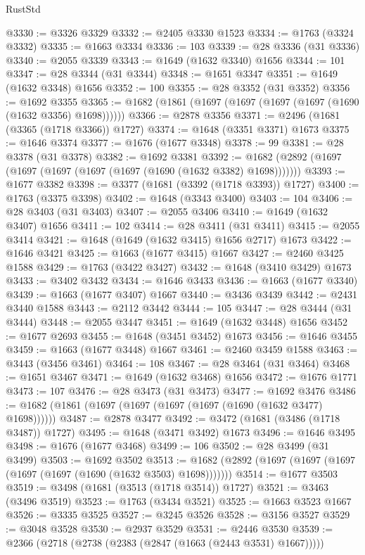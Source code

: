 \begin{lexlean}{RustStd}
\begin{coremodule}
@3330 := @3326 @3329
@3332 := @2405 @3330 @1523
@3334 := @1763 (@3324 @3332)
@3335 := @1663 @3334
@3336 := 103
@3339 := @28 @3336 (@31 @3336)
@3340 := @2055 @3339
@3343 := @1649 (@1632 @3340) @1656
@3344 := 101
@3347 := @28 @3344 (@31 @3344)
@3348 := @1651 @3347
@3351 := @1649 (@1632 @3348) @1656
@3352 := 100
@3355 := @28 @3352 (@31 @3352)
@3356 := @1692 @3355
@3365 := @1682 (@1861 (@1697 (@1697 (@1697 (@1697 (@1690 (@1632 @3356) @1698))))))
@3366 := @2878 @3356
@3371 := @2496 (@1681 (@3365 (@1718 @3366)) @1727)
@3374 := @1648 (@3351 @3371) @1673
@3375 := @1646 @3374
@3377 := @1676 (@1677 @3348)
@3378 := 99
@3381 := @28 @3378 (@31 @3378)
@3382 := @1692 @3381
@3392 := @1682 (@2892 (@1697 (@1697 (@1697 (@1697 (@1697 (@1690 (@1632 @3382) @1698)))))))
@3393 := @1677 @3382
@3398 := @3377 (@1681 (@3392 (@1718 @3393)) @1727)
@3400 := @1763 (@3375 @3398)
@3402 := @1648 (@3343 @3400)
@3403 := 104
@3406 := @28 @3403 (@31 @3403)
@3407 := @2055 @3406
@3410 := @1649 (@1632 @3407) @1656
@3411 := 102
@3414 := @28 @3411 (@31 @3411)
@3415 := @2055 @3414
@3421 := @1648 (@1649 (@1632 @3415) @1656 @2717) @1673
@3422 := @1646 @3421
@3425 := @1663 (@1677 @3415) @1667
@3427 := @2460 @3425 @1588
@3429 := @1763 (@3422 @3427)
@3432 := @1648 (@3410 @3429) @1673
@3433 := @3402 @3432
@3434 := @1646 @3433
@3436 := @1663 (@1677 @3340)
@3439 := @1663 (@1677 @3407) @1667
@3440 := @3436 @3439
@3442 := @2431 @3440 @1588
@3443 := @2112 @3442
@3444 := 105
@3447 := @28 @3444 (@31 @3444)
@3448 := @2055 @3447
@3451 := @1649 (@1632 @3448) @1656
@3452 := @1677 @2693
@3455 := @1648 (@3451 @3452) @1673
@3456 := @1646 @3455
@3459 := @1663 (@1677 @3448) @1667
@3461 := @2460 @3459 @1588
@3463 := @3443 (@3456 @3461)
@3464 := 108
@3467 := @28 @3464 (@31 @3464)
@3468 := @1651 @3467
@3471 := @1649 (@1632 @3468) @1656
@3472 := @1676 @1771
@3473 := 107
@3476 := @28 @3473 (@31 @3473)
@3477 := @1692 @3476
@3486 := @1682 (@1861 (@1697 (@1697 (@1697 (@1697 (@1690 (@1632 @3477) @1698))))))
@3487 := @2878 @3477
@3492 := @3472 (@1681 (@3486 (@1718 @3487)) @1727)
@3495 := @1648 (@3471 @3492) @1673
@3496 := @1646 @3495
@3498 := @1676 (@1677 @3468)
@3499 := 106
@3502 := @28 @3499 (@31 @3499)
@3503 := @1692 @3502
@3513 := @1682 (@2892 (@1697 (@1697 (@1697 (@1697 (@1697 (@1690 (@1632 @3503) @1698)))))))
@3514 := @1677 @3503
@3519 := @3498 (@1681 (@3513 (@1718 @3514)) @1727)
@3521 := @3463 (@3496 @3519)
@3523 := @1763 (@3434 @3521)
@3525 := @1663 @3523 @1667
@3526 := @3335 @3525
@3527 := @3245 @3526
@3528 := @3156 @3527
@3529 := @3048 @3528
@3530 := @2937 @3529
@3531 := @2446 @3530
@3539 := @2366 (@2718 (@2738 (@2383 (@2847 (@1663 (@2443 @3531) @1667)))))

\end{coremodule}
\end{lexlean}
